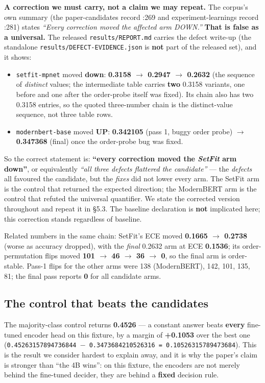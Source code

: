 \documentclass[11pt,a4paper]{article}
\begin{document}
\textbf{A correction we must carry, not a claim we may repeat.} The corpus's own summary (the paper-candidates record :269 and experiment-learnings record :281) states \emph{``Every correction moved the affected arm DOWN.''} \textbf{That is false as a universal.} The released \texttt{results/REPORT.md} carries the defect write-up (the standalone \texttt{results/DEFECT-EVIDENCE.json} is \textbf{not} part of the released set), and it shows:

\begin{itemize}
\item \texttt{setfit-mpnet} moved \textbf{down}: \textbf{0.3158 $\to$ 0.2947 $\to$ 0.2632} (the sequence of \emph{distinct} values; the intermediate table carries \textbf{two} 0.3158 variants, one before and one after the order-probe itself was fixed). Its chain also has two 0.3158 entries, so the quoted three-number chain is the distinct-value sequence, not three table rows.
\item \texttt{modernbert-base} moved \textbf{UP}: \textbf{0.342105} (pass 1, buggy order probe) $\to$ \textbf{0.347368} (final) once the order-probe bug was fixed.
\end{itemize}

So the correct statement is: \textbf{``every correction moved the \emph{SetFit} arm down''}, or equivalently \emph{``all three defects flattered the candidate''} --- the \emph{defects} all favoured the candidate, but the \emph{fixes} did not lower every arm. The SetFit arm is the control that returned the expected direction; the ModernBERT arm is the control that refuted the universal quantifier. We state the corrected version throughout and repeat it in \S5.3. The baseline declaration is \textbf{not} implicated here; this correction stands regardless of baseline.

Related numbers in the same chain: SetFit's ECE moved \textbf{0.1665 $\to$ 0.2738} (worse as accuracy dropped), with the \emph{final} 0.2632 arm at ECE \textbf{0.1536}; its order-permutation flips moved \textbf{101 $\to$ 46 $\to$ 36 $\to$ 0}, so the final arm is order-stable. Pass-1 flips for the other arms were 138 (ModernBERT), 142, 101, 135, 81; the final pass reports \textbf{0} for all candidate arms.

\subsection{The control that beats the candidates}

The majority-class control returns \textbf{0.4526} --- a constant answer beats \textbf{every} fine-tuned encoder head on this fixture, by a margin of \textbf{+0.1053} over the best one (\texttt{0.45263157894736844 $-$ 0.3473684210526316 = 0.10526315789473684}). This is the result we consider hardest to explain away, and it is why the paper's claim is stronger than ``the 4B wins'': on this fixture, the encoders are not merely behind the fine-tuned decider, they are behind a \textbf{fixed} decision rule.
\end{document}
